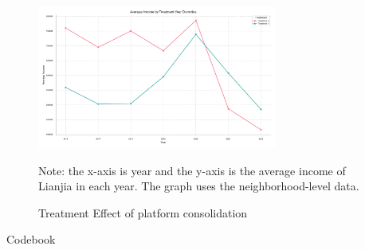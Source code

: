 \documentclass[11pt]{article}
\begin{document}
\clearpage

%       
  

\begin{figure}
    \centering
    \includegraphics[width=0.7\textwidth]{../figures/average_income_by_treatment_platform.pdf}
    \caption{Treatment Effect of platform consolidation}
    \label{fig:treatment_consolidation}
    Note: the x-axis is year and the y-axis is the average income of Lianjia in each year. The graph uses the neighborhood-level data.
\end{figure}

\begin{table}[H]
  \begin{center}
    \begin{scriptsize}
    \caption{Codebook}
    \label{tab:codebook}
      
  
    \end{scriptsize}
  \end{center}
\end{table}
\end{document}
